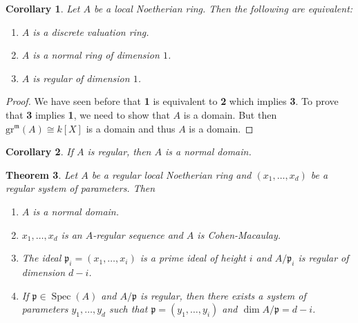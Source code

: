 \documentclass[leqno, openany]{memoir}
\newtheorem{thm}{Theorem}[section]
\newtheorem{cor}[thm]{Corollary}
\theoremstyle{definition}
\theoremstyle{remark}
\theoremstyle{plain}
\theoremstyle{definition}
\theoremstyle{remark}
\newcommand{\mf}[1]{\mathfrak{#1}}
\newcommand{\mr}[1]{\mathrm{#1}}
\DeclareMathOperator{\Spec}{Spec}
\begin{document}
\begin{cor} Let $A$ be a local Noetherian ring. Then the following are
equivalent: \begin{enumerate} \item $A$ is a discrete valuation ring.  \item
$A$ is a normal ring of dimension $1$.  \item $A$ is regular of dimension $1$.
\end{enumerate} \end{cor}

\begin{proof} We have seen before that \textbf{1} is equivalent to \textbf{2}
    which implies \textbf{3}. To prove that \textbf{3} implies \textbf{1}, we
    need to show that $A$ is a domain. But then $\mr{gr}^{\mf{m}}(A) \cong
    k[X]$ is a domain and thus $A$ is a domain.    \end{proof}

\begin{cor} If $A$ is regular, then $A$ is a normal domain.  \end{cor}

\begin{thm} Let $A$ be a regular local Noetherian ring and $(x_1, \ldots, x_d)$
    be a regular system of parameters. Then \begin{enumerate} \item $A$ is a
        normal domain.  \item $x_1, \ldots, x_d$ is an $A$-regular sequence and
        $A$ is Cohen-Macaulay.  \item The ideal $\mf{p}_i = (x_1, \ldots, x_i)$
        is a prime ideal of height $i$ and $A/ \mf{p}_i$ is regular of
        dimension $d-i$.  \item If $\mf{p} \in \Spec(A)$ and $A/ \mf{p}$ is
        regular, then there exists a system of parameters $y_1, \ldots, y_d$
        such that $\mf{p} = (y_1, \ldots, y_i)$ and $\dim A/\mf{p} = d-i$.
\end{enumerate} \end{thm}
\end{document}
